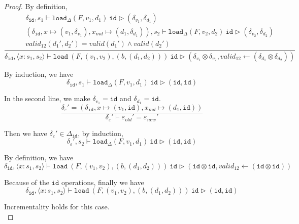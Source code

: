 \documentclass[10pt,twoside,a4paper]{article}
\theoremstyle{theorem}
\theoremstyle{lemma}
\theoremstyle{property}
\theoremstyle{definition}
\theoremstyle{assumption}
\def\id{\mathtt{id}}
\begin{document}
\begin{proof}
	By definition,
	\begin{displaymath}
	\frac{\begin{array}{c}
		\delta_{\id}, s_1 \vdash \mathtt{load}_\Delta (F,v_1,d_1)~ \id \rhd (\delta_{v_1},\delta_{d_1})\\
		(\delta_{\id}, x \mapsto (v_1, \delta_{v_1}), x_{md} \mapsto (d_1, \delta_{d_1})), s_2 \vdash \mathtt{load}_\Delta (F,v_2,d_2)~ \id \rhd (\delta_{v_2},\delta_{d_2})\\
		valid_{12}({d_1}',{d_2}') = valid({d_1}') \wedge valid({d_2}')
	\end{array}}
	{\delta_{\id}, \langle x:s_1,s_2 \rangle \vdash \mathtt{load}~ (F,(v_1,v_2),(b,(d_1,d_2)))~ \id \rhd (\delta_{v_1} \otimes \delta_{v_2},valid_{12} \leftarrow (\delta_{d_1} \otimes \delta_{d_2})) }
	\end{displaymath}

	By induction, we have
	\begin{displaymath}
		\delta_{\id}, s_1 \vdash \mathtt{load}_\Delta (F,v_1,d_1)~ \id \rhd (\id,\id)
	\end{displaymath}

	In the second line, we make $\delta_{v_1} = \id $ and $ \delta_{d_1} = \id$.
	\begin{displaymath}
	\frac{
		\delta_\varepsilon' = (\delta_{\id}, x \mapsto (v_1, \id), x_{md} \mapsto (d_1, \id))
	}
	{	\delta_\varepsilon' \vdash \varepsilon_{old}' = \varepsilon_{new}' }
	\end{displaymath}

	Then we have $\delta_\varepsilon' \in \Delta_{\id}$, by induction, 
	\begin{displaymath}
		\delta_\varepsilon', s_2 \vdash \mathtt{load}_\Delta (F,v_1,d_1)~ \id \rhd (\id,\id)
	\end{displaymath}

	By definition, we have
	\begin{displaymath}
		\delta_{\id}, \langle x:s_1,s_2 \rangle \vdash \mathtt{load}~ (F,(v_1,v_2),(b,(d_1,d_2)))~ \id \rhd (\id \otimes \id,valid_{12} \leftarrow (\id \otimes \id)) 
	\end{displaymath}

	Because of the $\id$ operations, finally we have
	\begin{displaymath}
		\delta_{\id}, \langle x:s_1,s_2 \rangle \vdash \mathtt{load}~ (F,(v_1,v_2),(b,(d_1,d_2)))~ \id \rhd (\id, \id) 
	\end{displaymath}

	Incrementality holds for this case.\\


\end{proof}
\end{document}

